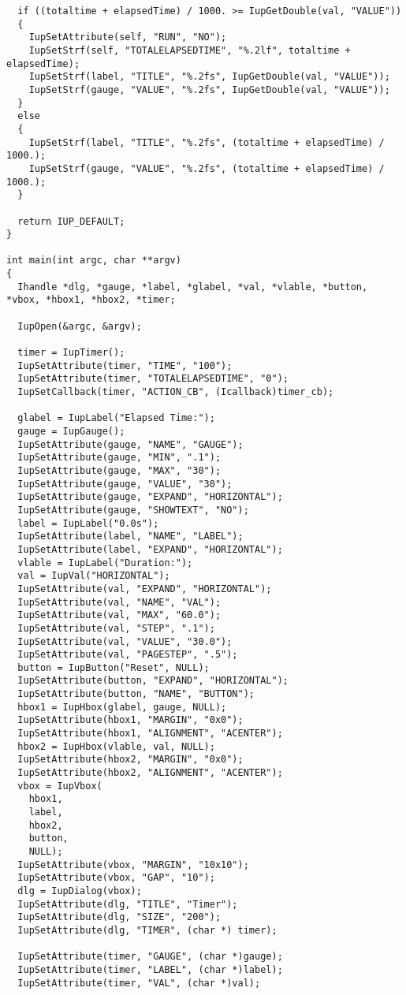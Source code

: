 \documentclass{ctexart}
\begin{document}
\begin{lstlisting}
  if ((totaltime + elapsedTime) / 1000. >= IupGetDouble(val, "VALUE"))
  {
    IupSetAttribute(self, "RUN", "NO");
    IupSetStrf(self, "TOTALELAPSEDTIME", "%.2lf", totaltime + elapsedTime);
    IupSetStrf(label, "TITLE", "%.2fs", IupGetDouble(val, "VALUE"));
    IupSetStrf(gauge, "VALUE", "%.2fs", IupGetDouble(val, "VALUE"));
  }
  else
  {
    IupSetStrf(label, "TITLE", "%.2fs", (totaltime + elapsedTime) / 1000.);
    IupSetStrf(gauge, "VALUE", "%.2fs", (totaltime + elapsedTime) / 1000.);
  }

  return IUP_DEFAULT;
}

int main(int argc, char **argv)
{
  Ihandle *dlg, *gauge, *label, *glabel, *val, *vlable, *button, *vbox, *hbox1, *hbox2, *timer;

  IupOpen(&argc, &argv);

  timer = IupTimer();
  IupSetAttribute(timer, "TIME", "100");
  IupSetAttribute(timer, "TOTALELAPSEDTIME", "0");
  IupSetCallback(timer, "ACTION_CB", (Icallback)timer_cb);

  glabel = IupLabel("Elapsed Time:");
  gauge = IupGauge();
  IupSetAttribute(gauge, "NAME", "GAUGE");
  IupSetAttribute(gauge, "MIN", ".1");
  IupSetAttribute(gauge, "MAX", "30");
  IupSetAttribute(gauge, "VALUE", "30");
  IupSetAttribute(gauge, "EXPAND", "HORIZONTAL");
  IupSetAttribute(gauge, "SHOWTEXT", "NO");
  label = IupLabel("0.0s");
  IupSetAttribute(label, "NAME", "LABEL");
  IupSetAttribute(label, "EXPAND", "HORIZONTAL");
  vlable = IupLabel("Duration:");
  val = IupVal("HORIZONTAL");
  IupSetAttribute(val, "EXPAND", "HORIZONTAL");
  IupSetAttribute(val, "NAME", "VAL");
  IupSetAttribute(val, "MAX", "60.0");
  IupSetAttribute(val, "STEP", ".1");
  IupSetAttribute(val, "VALUE", "30.0");
  IupSetAttribute(val, "PAGESTEP", ".5");
  button = IupButton("Reset", NULL);
  IupSetAttribute(button, "EXPAND", "HORIZONTAL");
  IupSetAttribute(button, "NAME", "BUTTON");
  hbox1 = IupHbox(glabel, gauge, NULL);
  IupSetAttribute(hbox1, "MARGIN", "0x0");
  IupSetAttribute(hbox1, "ALIGNMENT", "ACENTER");
  hbox2 = IupHbox(vlable, val, NULL);
  IupSetAttribute(hbox2, "MARGIN", "0x0");
  IupSetAttribute(hbox2, "ALIGNMENT", "ACENTER");
  vbox = IupVbox(
    hbox1,
    label,
    hbox2,
    button,
    NULL);
  IupSetAttribute(vbox, "MARGIN", "10x10");
  IupSetAttribute(vbox, "GAP", "10");
  dlg = IupDialog(vbox);
  IupSetAttribute(dlg, "TITLE", "Timer");
  IupSetAttribute(dlg, "SIZE", "200");
  IupSetAttribute(dlg, "TIMER", (char *) timer);

  IupSetAttribute(timer, "GAUGE", (char *)gauge);
  IupSetAttribute(timer, "LABEL", (char *)label);
  IupSetAttribute(timer, "VAL", (char *)val);


\end{lstlisting}
\end{document}
